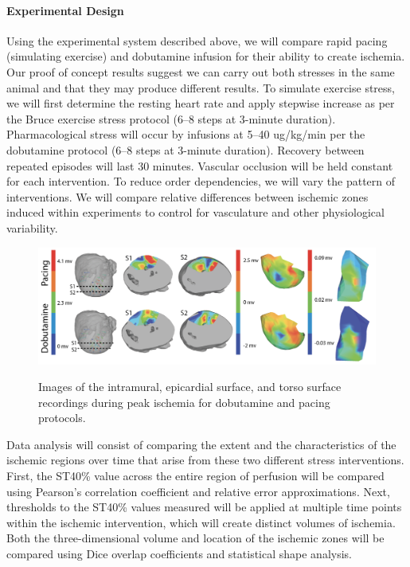 \paragraph{Experimental Design} Using the experimental system described above, we will compare rapid pacing (simulating exercise) and dobutamine infusion for their ability to create ischemia. Our proof of concept results suggest we can carry out both stresses in the same animal and that they may produce different results.  To simulate exercise stress, we will first determine the resting heart rate and apply stepwise increase as per the Bruce exercise stress protocol (6--8 steps at 3-minute duration).\cite{BLZ:Oki1986} Pharmacological stress will occur by infusions at 5--40 ug/kg/min per the dobutamine protocol (6--8 steps at 3-minute duration).\cite{BLZ:SAL1992} Recovery between repeated episodes will last 30 minutes. Vascular occlusion will be held constant for each intervention. To reduce order dependencies, we will vary the pattern of interventions. We will compare relative differences between ischemic zones induced within experiments to control for vasculature and other physiological variability.


\begin{figure}[htb]%
    \begin{center}
        {\includegraphics[width=\textwidth]
          {../Figures/fig2.png}}
        \captionsetup{width = \textwidth}
        \caption{\small \label{fig:dobutvspacing} Images of the
          intramural, epicardial surface, and torso surface recordings
          during peak ischemia for dobutamine and pacing protocols.}
    \end{center}
\end{figure}


Data analysis will consist of comparing the extent and the characteristics
of the ischemic regions over time that arise from these two different
stress interventions. First, the ST40\% value across the entire region of
perfusion will be compared using Pearson's correlation coefficient and
relative error approximations. Next, thresholds to the ST40\% values
measured will be applied at multiple time points within the ischemic
intervention, which will create distinct volumes of ischemia. Both the
three-dimensional volume and location of the ischemic zones will be
compared using Dice overlap coefficients and statistical shape analysis.

